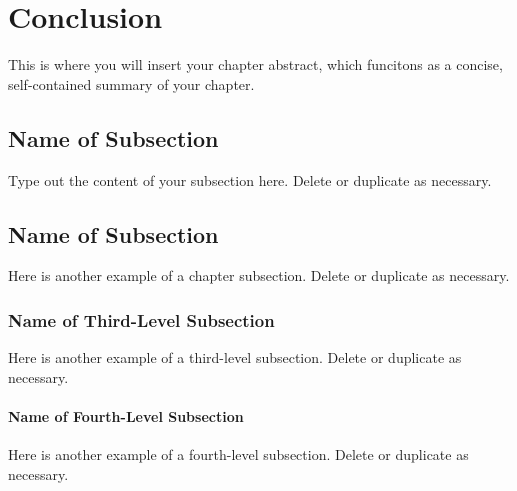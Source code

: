 \chapter{Conclusion} %

\begin{chapterabstract}

This is where you will insert your chapter abstract, which funcitons as a concise, self-contained summary of your chapter.


\end{chapterabstract}


\section{Name of Subsection}
Type out the content of your subsection here. Delete or duplicate as necessary.

\section{Name of Subsection}
Here is another example of a chapter subsection. Delete or duplicate as necessary.

\subsection{Name of Third-Level Subsection}
Here is another example of a third-level subsection. Delete or duplicate as necessary.

\subsubsection{Name of Fourth-Level Subsection}
Here is another example of a fourth-level subsection. Delete or duplicate as necessary.